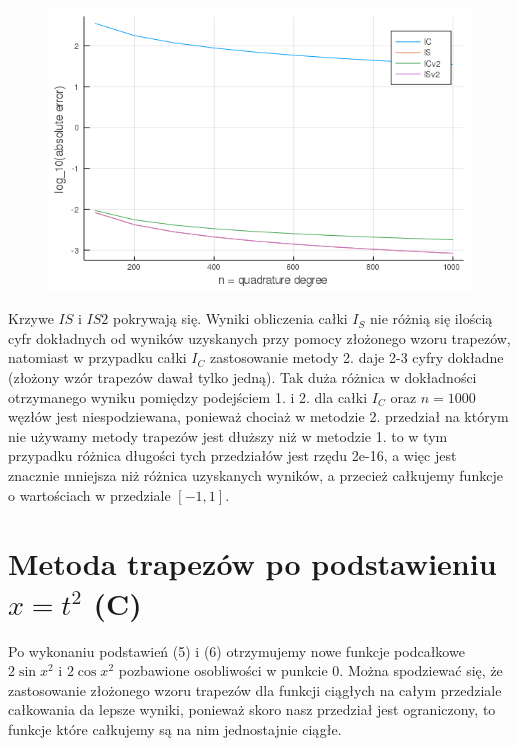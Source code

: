\documentclass{article}
\begin{document}
\begin{figure}[ht]
    \includegraphics[scale=0.5]{WykresBlogabsolute.png}
    \label{wykresB}
\end{figure}

Krzywe $IS$ i $IS2$ pokrywają się. Wyniki obliczenia całki $I_S$ nie różnią się ilością cyfr dokładnych od wyników uzyskanych przy pomocy złożonego wzoru trapezów, natomiast w przypadku całki $I_C$ zastosowanie metody 2. daje 2-3 cyfry dokładne (złożony wzór trapezów dawał tylko jedną). Tak duża różnica w dokładności otrzymanego wyniku pomiędzy podejściem 1. i 2. dla całki $I_C$ oraz $n=1000$ węzłów jest niespodziewana, ponieważ chociaż w metodzie 2. przedział na którym nie używamy metody trapezów jest dłuższy niż w metodzie 1. to w tym przypadku różnica długości tych przedziałów jest rzędu 2e-16, a więc jest znacznie mniejsza niż różnica uzyskanych wyników, a przecież całkujemy funkcje o wartościach w przedziale $[-1,1]$.

\section*{Metoda trapezów po podstawieniu $x=t^2$ (C)}
Po wykonaniu podstawień (5) i (6) otrzymujemy nowe funkcje podcałkowe $2\sin{x^2}$ i $2\cos{x^2}$ pozbawione osobliwości w punkcie 0. Można spodziewać się, że zastosowanie złożonego wzoru trapezów dla funkcji ciągłych na całym przedziale całkowania da lepsze wyniki, ponieważ skoro nasz przedział jest ograniczony, to funkcje które całkujemy są na nim jednostajnie ciągłe.

\newpage
\end{document}
